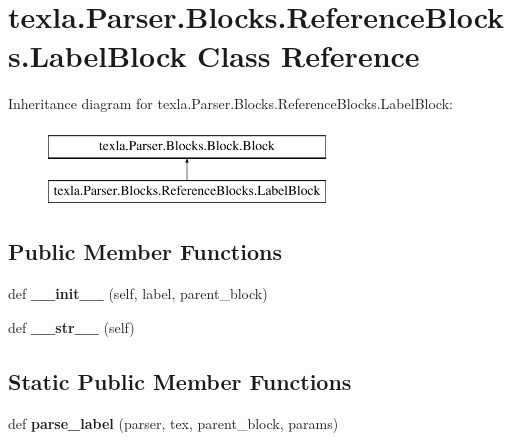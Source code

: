 \hypertarget{classtexla_1_1Parser_1_1Blocks_1_1ReferenceBlocks_1_1LabelBlock}{}\section{texla.\+Parser.\+Blocks.\+Reference\+Blocks.\+Label\+Block Class Reference}
\label{classtexla_1_1Parser_1_1Blocks_1_1ReferenceBlocks_1_1LabelBlock}
Inheritance diagram for texla.\+Parser.\+Blocks.\+Reference\+Blocks.\+Label\+Block\+:\begin{figure}[H]
\begin{center}
\leavevmode
\includegraphics[height=2.000000cm]{classtexla_1_1Parser_1_1Blocks_1_1ReferenceBlocks_1_1LabelBlock}
\end{center}
\end{figure}
\subsection*{Public Member Functions}
\begin{DoxyCompactItemize}
\item 
\hypertarget{classtexla_1_1Parser_1_1Blocks_1_1ReferenceBlocks_1_1LabelBlock_a91cae105c96931e4b0c02f01e095c3da}{}\label{classtexla_1_1Parser_1_1Blocks_1_1ReferenceBlocks_1_1LabelBlock_a91cae105c96931e4b0c02f01e095c3da} 
def {\bfseries \+\_\+\+\_\+init\+\_\+\+\_\+} (self, label, parent\+\_\+block)
\item 
\hypertarget{classtexla_1_1Parser_1_1Blocks_1_1ReferenceBlocks_1_1LabelBlock_ae4858d4d10980aab8cb6d5a8eeb90a31}{}\label{classtexla_1_1Parser_1_1Blocks_1_1ReferenceBlocks_1_1LabelBlock_ae4858d4d10980aab8cb6d5a8eeb90a31} 
def {\bfseries \+\_\+\+\_\+str\+\_\+\+\_\+} (self)
\end{DoxyCompactItemize}
\subsection*{Static Public Member Functions}
\begin{DoxyCompactItemize}
\item 
\hypertarget{classtexla_1_1Parser_1_1Blocks_1_1ReferenceBlocks_1_1LabelBlock_ad3e9c07484143a2d3000d79a49ddefaf}{}\label{classtexla_1_1Parser_1_1Blocks_1_1ReferenceBlocks_1_1LabelBlock_ad3e9c07484143a2d3000d79a49ddefaf} 
def {\bfseries parse\+\_\+label} (parser, tex, parent\+\_\+block, params)
\end{DoxyCompactItemize}
